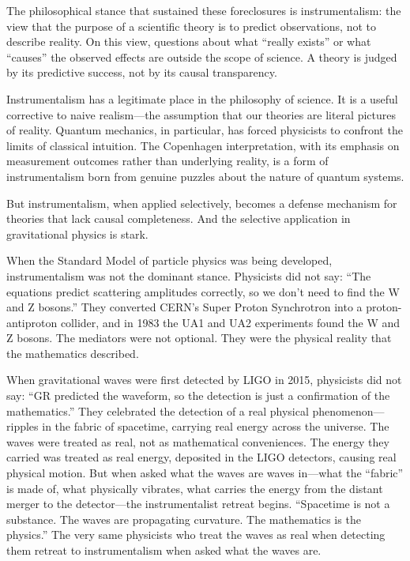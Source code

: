 \documentclass[11pt]{article}
\begin{document}
The philosophical stance that sustained these foreclosures is instrumentalism: the view that the purpose of a scientific theory is to predict observations, not to describe reality. On this view, questions about what ``really exists'' or what ``causes'' the observed effects are outside the scope of science. A theory is judged by its predictive success, not by its causal transparency.

Instrumentalism has a legitimate place in the philosophy of science. It is a useful corrective to naive realism---the assumption that our theories are literal pictures of reality. Quantum mechanics, in particular, has forced physicists to confront the limits of classical intuition. The Copenhagen interpretation, with its emphasis on measurement outcomes rather than underlying reality, is a form of instrumentalism born from genuine puzzles about the nature of quantum systems.

But instrumentalism, when applied selectively, becomes a defense mechanism for theories that lack causal completeness. And the selective application in gravitational physics is stark.

When the Standard Model of particle physics was being developed, instrumentalism was not the dominant stance. Physicists did not say: ``The equations predict scattering amplitudes correctly, so we don't need to find the W and Z bosons.'' They converted CERN's Super Proton Synchrotron into a proton-antiproton collider, and in 1983 the UA1 and UA2 experiments found the W and Z bosons. The mediators were not optional. They were the physical reality that the mathematics described.

When gravitational waves were first detected by LIGO in 2015, physicists did not say: ``GR predicted the waveform, so the detection is just a confirmation of the mathematics.'' They celebrated the detection of a real physical phenomenon---ripples in the fabric of spacetime, carrying real energy across the universe. The waves were treated as real, not as mathematical conveniences. The energy they carried was treated as real energy, deposited in the LIGO detectors, causing real physical motion. But when asked what the waves are waves in---what the ``fabric'' is made of, what physically vibrates, what carries the energy from the distant merger to the detector---the instrumentalist retreat begins. ``Spacetime is not a substance. The waves are propagating curvature. The mathematics is the physics.'' The very same physicists who treat the waves as real when detecting them retreat to instrumentalism when asked what the waves are.
\end{document}
